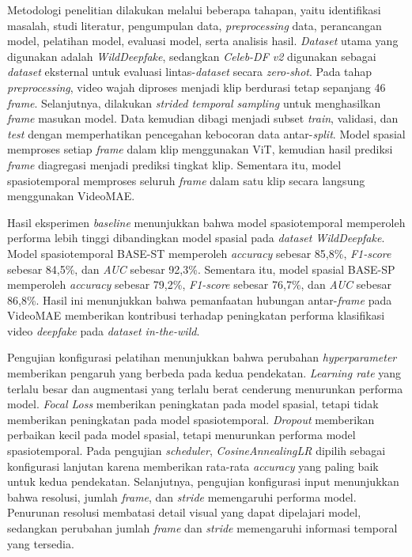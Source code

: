 \begin{center}
	Metodologi penelitian dilakukan melalui beberapa tahapan, yaitu identifikasi masalah, studi literatur, pengumpulan data, \textit{preprocessing} data, perancangan model, pelatihan model, evaluasi model, serta analisis hasil. \textit{Dataset} utama yang digunakan adalah \textit{WildDeepfake}, sedangkan \textit{Celeb-DF v2} digunakan sebagai \textit{dataset} eksternal untuk evaluasi lintas-\textit{dataset} secara \textit{zero-shot}. Pada tahap \textit{preprocessing}, video wajah diproses menjadi klip berdurasi tetap sepanjang 46 \textit{frame}. Selanjutnya, dilakukan \textit{strided temporal sampling} untuk menghasilkan \textit{frame} masukan model. Data kemudian dibagi menjadi subset \textit{train}, validasi, dan \textit{test} dengan memperhatikan pencegahan kebocoran data antar-\textit{split}. Model spasial memproses setiap \textit{frame} dalam klip menggunakan ViT, kemudian hasil prediksi \textit{frame} diagregasi menjadi prediksi tingkat klip. Sementara itu, model spasiotemporal memproses seluruh \textit{frame} dalam satu klip secara langsung menggunakan VideoMAE. \par

	Hasil eksperimen \textit{baseline} menunjukkan bahwa model spasiotemporal memperoleh performa lebih tinggi dibandingkan model spasial pada \textit{dataset} \textit{WildDeepfake}. Model spasiotemporal BASE-ST memperoleh \textit{accuracy} sebesar 85,8\%, \textit{F1-score} sebesar 84,5\%, dan \textit{AUC} sebesar 92,3\%. Sementara itu, model spasial BASE-SP memperoleh \textit{accuracy} sebesar 79,2\%, \textit{F1-score} sebesar 76,7\%, dan \textit{AUC} sebesar 86,8\%. Hasil ini menunjukkan bahwa pemanfaatan hubungan antar-\textit{frame} pada VideoMAE memberikan kontribusi terhadap peningkatan performa klasifikasi video \textit{deepfake} pada \textit{dataset in-the-wild}. \par

	Pengujian konfigurasi pelatihan menunjukkan bahwa perubahan \textit{hyperparameter} memberikan pengaruh yang berbeda pada kedua pendekatan. \textit{Learning rate} yang terlalu besar dan augmentasi yang terlalu berat cenderung menurunkan performa model. \textit{Focal Loss} memberikan peningkatan pada model spasial, tetapi tidak memberikan peningkatan pada model spasiotemporal. \textit{Dropout} memberikan perbaikan kecil pada model spasial, tetapi menurunkan performa model spasiotemporal. Pada pengujian \textit{scheduler}, \textit{CosineAnnealingLR} dipilih sebagai konfigurasi lanjutan karena memberikan rata-rata \textit{accuracy} yang paling baik untuk kedua pendekatan. Selanjutnya, pengujian konfigurasi input menunjukkan bahwa resolusi, jumlah \textit{frame}, dan \textit{stride} memengaruhi performa model. Penurunan resolusi membatasi detail visual yang dapat dipelajari model, sedangkan perubahan jumlah \textit{frame} dan \textit{stride} memengaruhi informasi temporal yang tersedia. \par


\end{center}
